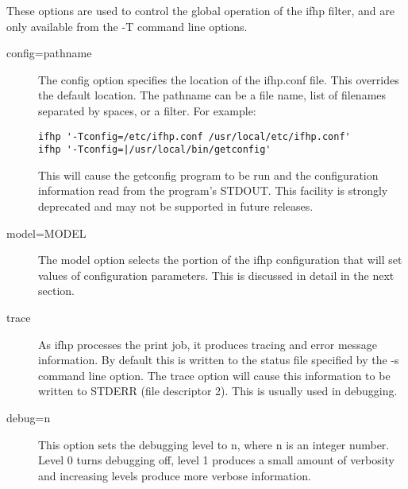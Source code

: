 \documentclass[a4paper]{article}
\begin{document}
These options are used to control the global operation
of the {\ttfamily ifhp} filter,
and are only available from the {\ttfamily -T} command line options.
\begin{description}
\item[config=pathname] \mbox{}

The {\ttfamily config} option specifies the location of the {\ttfamily ifhp.conf} file.
This overrides the default location.
The pathname can be a file name, list of filenames separated by spaces,
or a filter.
For example:
\begin{tscreen}
\begin{verbatim}
ifhp '-Tconfig=/etc/ifhp.conf /usr/local/etc/ifhp.conf'
ifhp '-Tconfig=|/usr/local/bin/getconfig'
\end{verbatim}
\end{tscreen}


This will cause the {\ttfamily getconfig} program to be run and the configuration information
read from the program's STDOUT.
This facility is strongly deprecated and
may not be supported in future releases.



\item[model=MODEL] \mbox{}

The {\ttfamily model} option selects the portion of the ifhp configuration
that will set values of configuration parameters.
This is discussed in detail in the next section.



\item[trace] \mbox{}

As {\ttfamily ifhp} processes the print job,  it produces tracing and error message
information.
By default this is written to the status file specified by the {\ttfamily -s}
command line option.
The {\ttfamily trace} option will cause this information to be written to
{\ttfamily STDERR} (file descriptor 2).
This is usually used in debugging.



\item[debug=n] \mbox{}

This option sets the debugging level to {\ttfamily n}, where {\ttfamily n} is an integer number.
Level 0 turns debugging off, level 1 produces a small amount of verbosity
and increasing levels produce more verbose information.

\end{description}
\end{document}
